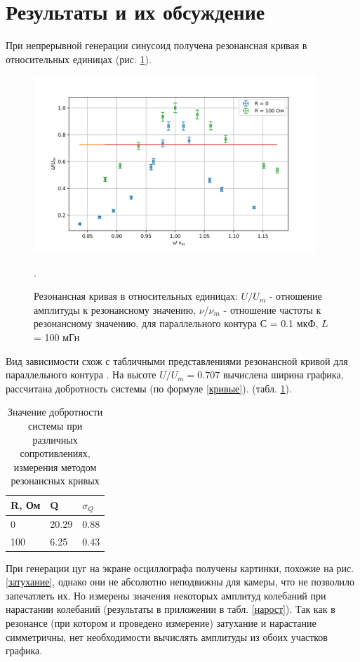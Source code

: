 \documentclass[a4paper,12pt]{article} %
\begin{document}
\section{Результаты и их обсуждение}
При непрерывной генерации синусоид получена резонансная кривая в относительных единицах (рис. \ref{график}). 

\begin{figure}[h!]
\begin{center}
\includegraphics[width=0.95\textwidth]{graf}
\caption{Резонансная кривая в относительных единицах: $U/U_m$ - отношение амплитуды к резонансному значению, $\nu/\nu_m$ - отношение частоты к резонансному значению, для параллельного контура $С $ = 0.1 мкФ, $L$ = 100 мГн} \label{график}.
\end{center}
\end{figure} 

Вид зависимости схож с табличными представлениями резонансной кривой для параллельного контура \cite{labnik}. На высоте $U/U_m = 0.707$ вычислена ширина графика, рассчитана добротность системы (по формуле \ref{кривые}). (табл. \ref{кривые_табл}).
\begin{table}[h!]
\caption{Значение добротности системы при различных сопротивлениях, измерения методом резонансных кривых}
\label{кривые_табл}
\begin{tabular}{|l|l|l|}
\hline
R, Ом & Q     & $\sigma_Q$ \\ \hline
0     & 20.29 & 0.88       \\ \hline
100   & 6.25  & 0.43       \\ \hline
\end{tabular}
\end{table}

При генерации цуг на экране осциллографа получены картинки, похожие на рис. \ref{затухание}, однако они не абсолютно неподвижны для камеры, что не позволило запечатлеть их. Но измерены значения некоторых амплитуд колебаний при нарастании колебаний (результаты в приложении в табл.  \ref{нарост}). Так как в резонансе (при котором и проведено измерение) затухание и нарастание симметричны, нет необходимости вычислять амплитуды из обоих участков графика.
\end{document}
